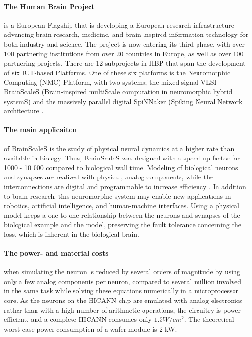 \paragraph{The Human Brain Project} is a European Flagship that is developing a European research infrastructure advancing brain research, medicine, and brain-inspired information technology for both industry and science.
The project is now entering its third phase, with over 100 partnering institutions from over 20 countries in Europe, as well as over 100 partnering projects.
There are 12 subprojects in HBP that span the development of six ICT-based Platforms.
One of these six platforms is the Neuromorphic Computing (NMC) Platform, with two systems;
the mixed-signal VLSI BrainScaleS (Brain-inspired multiScale computation in neuromorphic hybrid systemS) and the massively parallel digital SpiNNaker (Spiking Neural Network architecture \cite{amunts_human_2016}.

\paragraph{The main applicaiton} of BrainScaleS is the study of physical neural dynamics at a higher rate than available in biology.
Thus, BrainScaleS was designed with a speed-up factor for 1000 - 10 000 compared to biological wall time.
Modeling of biological neurons and synapses are realized with physical, analog components, while the interconnections are digital and programmable to increase efficiency \cite{zoschke_full_2017}.
In addition to brain research, this neuromorphic system may enable new applications in robotics, artificial intelligence, and human-machine interfaces.
Using a physical model keeps a one-to-one relationship between the neurons and synapses of the biological example and the model,
preserving the fault tolerance concerning the loss, which is inherent in the biological brain.

\paragraph{The power- and material costs} when simulating the neuron is reduced by several orders of magnitude by using only a few analog components per neuron, compared to several million involved in the same task while solving these equations numerically in a microprocessor core.
\cite{schemmel_wafer-scale_2010}
As the neurons on the HICANN chip are emulated with analog electronics rather than with a high number of arithmetic operations, the circuitry is power-efficient, and a complete HICANN consumes only $1.3 W/cm^2$.
The theoretical worst-case power consumption of a wafer module is 2 kW.
\cite{zoschke_full_2017}


